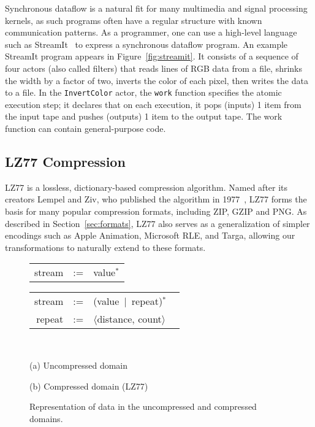Synchronous dataflow is a natural fit for many multimedia and signal
processing kernels, as such programs often have a regular structure
with known communication patterns.  As a programmer, one can use a
high-level language such as StreamIt~\cite{streamitcc} to express a
synchronous dataflow program.  An example StreamIt program appears in
Figure~\ref{fig:streamit}.  It consists of a sequence of four actors
(also called filters) that reads lines of RGB data from a file,
shrinks the width by a factor of two, inverts the color of each pixel,
then writes the data to a file.  In the {\tt InvertColor} actor, the
{\tt work} function specifies the atomic execution step; it declares
that on each execution, it pops (inputs) 1 item from the input tape
and pushes (outputs) 1 item to the output tape.  The work function can
contain general-purpose code.

\subsection{LZ77 Compression}

LZ77 is a lossless, dictionary-based compression algorithm.  Named
after its creators Lempel and Ziv, who published the algorithm in
1977~\cite{lz77}, LZ77 forms the basis for many popular compression
formats, including ZIP, GZIP and PNG.  As described in
Section~\ref{sec:formats}, LZ77 also serves as a generalization of
simpler encodings such as Apple Animation, Microsoft RLE, and Targa,
allowing our transformations to naturally extend to these formats.

\begin{figure}[t]
\begin{minipage}{1.6in}
\hspace{-5pt}\begin{tabular}{rcl}
stream&\hspace{-9pt}:=&\hspace{-9pt}value$^*$
\end{tabular}
\end{minipage}
\begin{minipage}{1.8in}
\hspace{-5pt}\begin{tabular}{rcl}
stream&\hspace{-9pt}:=&\hspace{-9pt}(value~$|$~repeat)$^*$ ~ \\
repeat&\hspace{-9pt}:=&\hspace{-9pt}$\langle$distance, count$\rangle$
\end{tabular}
\end{minipage} 
~ \\
\begin{minipage}{1.6in}
(a) Uncompressed domain
\end{minipage}
(b) Compressed domain (LZ77)
\caption{Representation of data in the uncompressed and compressed
domains.  \protect\label{fig:domains}}
\end{figure}

